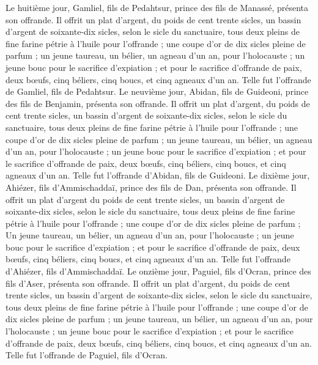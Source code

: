\begin{multicols}{2}
Le huitième jour, Gamliel, fils de Pedahtsur, prince des fils de Manassé, présenta son offrande.
Il offrit un plat d'argent, du poids de cent trente sicles, un bassin d'argent de soixante-dix sicles, selon le sicle du sanctuaire, tous deux pleins de fine farine pétrie à l'huile pour l'offrande ;
une coupe d'or de dix sicles pleine de parfum ;
un jeune taureau, un bélier, un agneau d'un an, pour l'holocauste ;
un jeune bouc pour le sacrifice d'expiation ;
et pour le sacrifice d'offrande de paix, deux bœufs, cinq béliers, cinq boucs, et cinq agneaux d'un an. Telle fut l'offrande de Gamliel, fils de Pedahtsur.
Le neuvième jour, Abidan, fils de Guideoni, prince des fils de Benjamin, présenta son offrande.
Il offrit un plat d'argent, du poids de cent trente sicles, un bassin d'argent de soixante-dix sicles, selon le sicle du sanctuaire, tous deux pleins de fine farine pétrie à l'huile pour l'offrande ;
une coupe d'or de dix sicles pleine de parfum ;
un jeune taureau, un bélier, un agneau d'un an, pour l'holocauste ;
un jeune bouc pour le sacrifice d'expiation ;
et pour le sacrifice d'offrande de paix, deux bœufs, cinq béliers, cinq boucs, et cinq agneaux d'un an. Telle fut l'offrande d'Abidan, fils de Guideoni.
Le dixième jour, Ahiézer, fils d'Ammischaddaï, prince des fils de Dan, présenta son offrande.
Il offrit un plat d'argent du poids de cent trente sicles, un bassin d'argent de soixante-dix sicles, selon le sicle du sanctuaire, tous deux pleins de fine farine pétrie à l'huile pour l'offrande ;
une coupe d'or de dix sicles pleine de parfum ;
Un jeune taureau, un bélier, un agneau d'un an, pour l'holocauste ;
un jeune bouc pour le sacrifice d'expiation ;
et pour le sacrifice d'offrande de paix, deux bœufs, cinq béliers, cinq boucs, et cinq agneaux d'un an. Telle fut l'offrande d'Ahiézer, fils d'Ammischaddaï.
Le onzième jour, Paguiel, fils d'Ocran, prince des fils d'Aser, présenta son offrande.
Il offrit un plat d'argent, du poids de cent trente sicles, un bassin d'argent de soixante-dix sicles, selon le sicle du sanctuaire, tous deux pleins de fine farine pétrie à l'huile pour l'offrande ;
une coupe d'or de dix sicles pleine de parfum ;
un jeune taureau, un bélier, un agneau d'un an, pour l'holocauste ;
un jeune bouc pour le sacrifice d'expiation ;
et pour le sacrifice d'offrande de paix, deux bœufs, cinq béliers, cinq boucs, et cinq agneaux d'un an. Telle fut l'offrande de Paguiel, fils d'Ocran.

\end{multicols}

